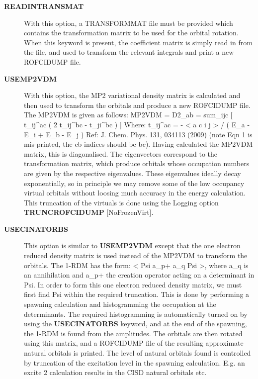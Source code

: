 \documentclass[openany,a4paper,10pt,english]{manual}
\begin{document}
\begin{description}
\item[\textbf{READINTRANSMAT}] \leavevmode
With this option, a TRANSFORMMAT file must be provided which contains the transformation
matrix to be used for the orbital rotation.  When this keyword is present, the coefficient
matrix is simply read in from the file, and used to transform the relevant integrals and
print a new ROFCIDUMP file.

\item[\textbf{USEMP2VDM}] \leavevmode
With this option, the MP2 variational density matrix is calculated and then used to transform
the orbitals and produce a new ROFCIDUMP file.  The MP2VDM is given as follows:
MP2VDM = D2\_ab = sum\_ijc {[} t\_ij\textasciicircum{}ac ( 2 t\_ij\textasciicircum{}bc - t\_ji\textasciicircum{}bc ) {]}
Where: t\_ij\textasciicircum{}ac = - \textless{} a c \textbar{} i j \textgreater{} / ( E\_a - E\_i + E\_b - E\_j )
Ref: J. Chem. Phys. 131, 034113 (2009) (note Eqn 1 is mis-printed, the cb indices should be bc).
Having calculated the MP2VDM matrix, this is diagonalised.  The eigenvectors correspond to the
transformation matrix, which produce orbitals whose occupation numbers are given by the
respective eigenvalues.  These eigenvalues ideally decay exponentially, so in principle we
may remove some of the low occupancy virtual orbitals without loosing much accuracy in the
energy calculation.  This truncation of the virtuals is done using the Logging option
\textbf{TRUNCROFCIDUMP} {[}NoFrozenVirt{]}.

\item[\textbf{USECINATORBS}] \leavevmode
This option is similar to \textbf{USEMP2VDM} except that the one electron reduced density matrix is
used instead of the MP2VDM to transform the orbitals.
The 1-RDM has the form: \textless{} Psi \textbar{} a\_p+ a\_q \textbar{} Psi \textgreater{}, where a\_q is an annihilation and a\_p+ the
creation operator acting on a determinant in Psi.
In order to form this one electron reduced density matrix, we must first find Psi within the
required truncation.  This is done by performing a spawning calculation and histogramming the
occupation at the determinants.  The required histogramming is automatically turned on by using the
\textbf{USECINATORBS} keyword, and at the end of the spawning, the 1-RDM is found from the amplitudes.
The orbitals are then rotated using this matrix, and a ROFCIDUMP file of the resulting approximate
natural orbitals is printed. The level of natural orbitals found is controlled by truncation of
the excitation level in the spawning calculation.  E.g. an excite 2 calculation results in the CISD
natural orbitals etc.

\end{description}
\end{document}
